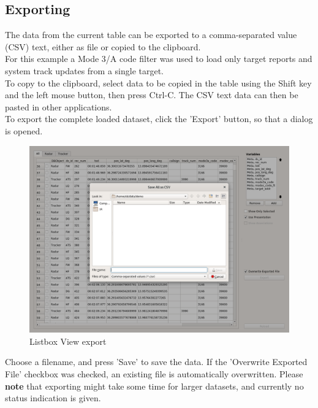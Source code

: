 \subsection{Exporting}
\label{sec:exporting}

The data from the current  table can be exported to a comma-separated value (CSV) text, either as file or copied to the clipboard. \\

For this example a Mode 3/A code filter was used to load only target reports and system track updates from a single target. \\

To copy to the clipboard, select data to be copied in the table using the Shift key and the left mouse button, then press Ctrl-C. The CSV text data can then be pasted in other applications. \\

To export the complete loaded dataset, click the 'Export' button, so that a dialog is opened.

\begin{figure}[H]
    \hspace*{-2cm}
    \includegraphics[width=18cm,frame]{figures/listbox_export.png}
  \caption{Listbox View export}
\end{figure}

Choose a filename, and press 'Save' to save the data. If the 'Overwrite Exported File' checkbox was checked, an existing file is automatically overwritten. Please \textbf{note} that exporting might take some time for larger datasets, and currently no status indication is given.\\

